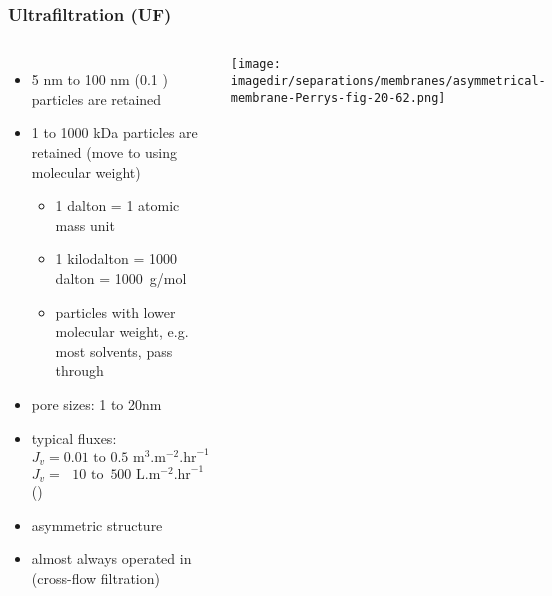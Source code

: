 \begin{frame}\frametitle{Ultrafiltration (UF)}
	\begin{columns}[c]
			\vspace{-20pt}
			\begin{itemize}
				\item	5 nm to 100 nm (0.1 \micron) particles are retained
				\item	1 to 1000 kDa particles are retained (move to using molecular weight)
				\begin{itemize}
					\item	1 dalton = 1 atomic mass unit
					\item	1 {\color{purple}kilodalton} = 1000 dalton = 1000~g/mol
					\item	particles with lower molecular weight, e.g. most solvents, pass through
				\end{itemize}
				\item	pore sizes: 1 to 20nm  %
				\item	typical fluxes: $J_v = 0.01 \text{~to~} 0.5 \text{~m}^3\text{.m}^{-2}.\text{hr}^{-1}$\\$J_v = ~~\,10 \text{~to~} \,500 \text{~L}\text{.m}^{-2}.\text{hr}^{-1}$ ({\color{purple}{LMH}}) %
				\item	asymmetric structure
				\item	almost always operated in {\color{purple}{TFF}} (cross-flow filtration)
			\end{itemize}
			\begin{center}
				\texttt{[image: \\imagedir/separations/membranes/asymmetrical-membrane-Perrys-fig-20-62.png]}
			\end{center}
			\vspace{-12pt}
	\end{columns}
\end{frame}

